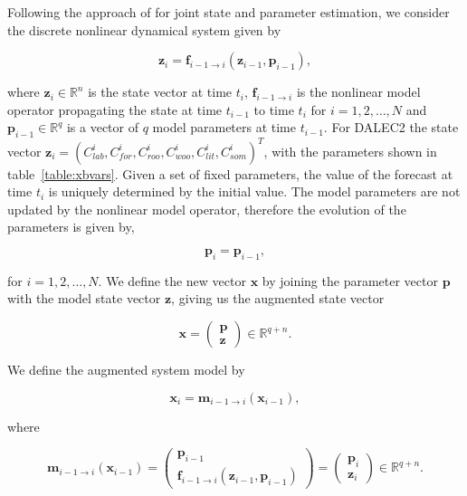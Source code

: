 \documentclass[review]{elsarticle}
\begin{document}
Following the approach of \citet{Smith2011436} for joint state and parameter estimation, we consider the discrete nonlinear dynamical system given by
\begin{linenomath}
\begin{equation}
\textbf{z}_{i} = \textbf{f}_{i-1\rightarrow i}(\textbf{z}_{i-1}, \textbf{p}_{i-1}),
\end{equation}
\end{linenomath}
where \( \textbf{z}_{i} \in \mathbb{R}^{n} \) is the state vector at time \( t_i \), \(\textbf{f}_{i-1 \rightarrow i}\) is the nonlinear model operator propagating the state at time \(t_{i-1}\) to time \(t_{i}\) for \(i = 1, 2, \dots, N\) and \(\textbf{p}_{i-1} \in \mathbb{R}^{q}\) is a vector of \(q\) model parameters at time \(t_{i-1}\). For DALEC2 the state vector \(\textbf{z}_{i}=(C_{lab}^{i}, C_{for}^{i}, C_{roo}^{i}, C_{woo}^{i}, C_{lit}^{i}, C_{som}^{i})^{T}\), with the parameters shown in table~\ref{table:xbvars}. Given a set of fixed parameters, the value of the forecast at time \(t_i\) is uniquely determined by the initial value. The model parameters are not updated by the nonlinear model operator, therefore the evolution of the parameters is given by,
\begin{linenomath}
\begin{equation}
\textbf{p}_{i} = \textbf{p}_{i-1}, 
\end{equation}
\end{linenomath}
for $i= 1, 2, \dots, N$. We define the new vector $\textbf{x}$ by joining the parameter vector $\textbf{p}$ with the model state vector $\textbf{z}$, giving us the augmented state vector
\begin{linenomath}
\begin{equation}
\textbf{x} =
\begin{pmatrix}
\textbf{p} \\
\textbf{z}
\end{pmatrix}
\in \mathbb{R}^{q+n}.
\end{equation}
\end{linenomath}
We define the augmented system model by
\begin{linenomath}
\begin{equation}
\textbf{x}_{i} = \textbf{m}_{i-1 \rightarrow i}(\textbf{x}_{i-1}), \label{eqn:nonlinmod}
\end{equation}
\end{linenomath}
where
\begin{linenomath}
\begin{equation}
\textbf{m}_{i-1\rightarrow i}(\textbf{x}_{i-1}) =
\begin{pmatrix}
\textbf{p}_{i-1} \\
\textbf{f}_{i-1\rightarrow i}(\textbf{z}_{i-1}, \textbf{p}_{i-1})
\end{pmatrix}
=
\begin{pmatrix}
\textbf{p}_{i} \\
\textbf{z}_{i}
\end{pmatrix}
\in \mathbb{R}^{q+n}.
\end{equation}
\end{linenomath}
\end{document}
